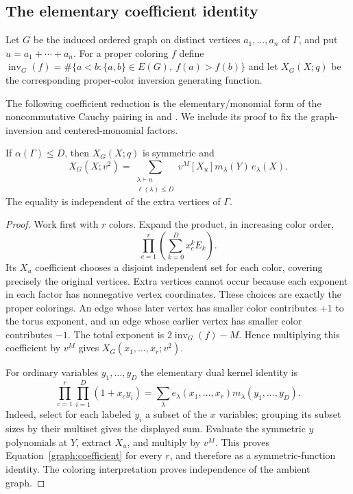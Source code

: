\subsection{The elementary coefficient identity}

Let $G$ be the induced ordered graph on distinct vertices
$a_1,\ldots,a_n$ of $\Gamma$, and put $u=a_1+\cdots+a_n$.
For a proper coloring $f$ define
$\operatorname{inv}_G(f)=\#\{a<b:\{a,b\}\in E(G),\ f(a)>f(b)\}$
and let $X_G(X;q)$ be the corresponding proper-color inversion
generating function.

The following coefficient reduction is the elementary/monomial form
of the noncommutative Cauchy pairing in
\cite[Theorem~4.4, Corollary~4.5 and Proposition~4.25]{Hwa24} and
\cite[Proposition~2.9 and Corollary~2.10]{BEPS25}.  We include its
proof to fix the graph-inversion and centered-monomial factors.

\begin{proposition}
\label{graph:kernel}
If $\alpha(\Gamma)\le D$, then $X_G(X;q)$ is symmetric and
\begin{equation}
 X_G(X;v^2)=\sum_{\substack{\lambda\vdash n\\\ell(\lambda)\le D}}
       v^M[X_u]m_\lambda(Y)\,e_\lambda(X).
 \label{graph:coefficient}
\end{equation}
The equality is independent of the extra vertices of $\Gamma$.
\end{proposition}

\begin{proof}
Work first with $r$ colors. Expand the product, in increasing color
order,
\[
 \prod_{c=1}^r\left(\sum_{k=0}^D x_c^k E_k\right).
\]
Its $X_u$ coefficient chooses a disjoint independent set for each
color, covering precisely the original vertices. Extra vertices
cannot occur because each exponent in each factor has nonnegative
vertex coordinates. These choices are exactly the proper colorings.
An edge whose later vertex has smaller color contributes $+1$ to the
torus exponent, and an edge whose earlier vertex has smaller color
contributes $-1$. The total exponent is
$2\operatorname{inv}_G(f)-M$. Hence multiplying this coefficient by
$v^M$ gives $X_G(x_1,\ldots,x_r;v^2)$.

For ordinary variables $y_1,\ldots,y_D$ the elementary dual kernel
identity is
\[
 \prod_{c=1}^r\prod_{i=1}^D(1+x_cy_i)
   =\sum_\lambda e_\lambda(x_1,\ldots,x_r)m_\lambda(y_1,\ldots,y_D).
\]
Indeed, select for each labeled $y_i$ a subset of the $x$ variables;
grouping its subset sizes by their multiset gives the displayed sum.
Evaluate the symmetric $y$ polynomials at $Y$, extract $X_u$, and
multiply by $v^M$. This proves Equation~\eqref{graph:coefficient} for
every $r$, and therefore as a symmetric-function identity. The
coloring interpretation proves independence of the ambient graph.
\end{proof}

